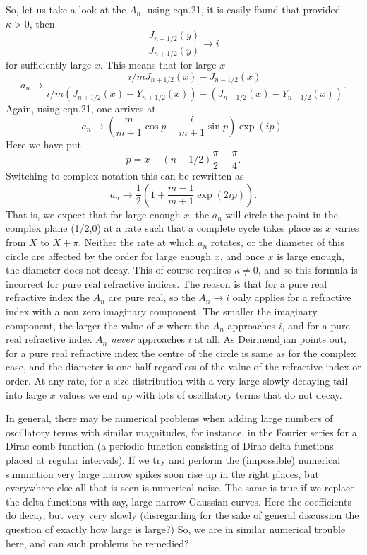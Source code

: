 \documentclass[12pt]{article}
\begin{document}
So, let us take a look at the $A_n$, using  eqn.21, it is easily found that provided $\kappa>0$,
then
\begin{equation}
\frac{J_{n-1/2}(y)}{J_{n+1/2}(y)} \rightarrow i
\end{equation}
for sufficiently large $x$.
This means that for large $x$
\begin{equation}
a_n \rightarrow \frac{ i/m J_{n+1/2}(x)-J_{n-1/2}(x)}
                     { i/m (J_{n+1/2}(x)-Y_{n+1/2}(x) ) -(J_{n-1/2}(x)-Y_{n-1/2}(x) ) }.
\end{equation}
Again, using eqn.21, one arrives at
\begin{equation}
a_n \rightarrow  \left ( \frac{m}{m+1} \cos p -\frac{i}{m+1} \sin p \right) \exp(ip).
\end{equation}
Here we have put
\begin{equation}
p=x-(n-1/2) \frac{\pi}{2} -\frac{\pi}{4}.
\end{equation}
Switching to complex notation this can be rewritten as
\begin{equation}
a_n \rightarrow \frac{1}{2} \left ( 1+\frac{m-1}{m+1}  \exp(2 i p) \right ).
\end{equation}
That is, we expect that for large enough $x$, the $a_n$ will  circle the point in the complex
plane (1/2,0) at a rate such that  a complete cycle takes place as $x$ varies from $X$
 to $X+\pi$. Neither the rate at which $a_n$ rotates, or the diameter of this circle are affected by the order
for large enough $x$, and once $x$ is large enough, the diameter does not decay.
 This of course requires $\kappa \ne 0$, and so this formula is incorrect
for pure real refractive indices. The reason is that for a pure real refractive 
index the $A_n$ are pure real, so the  $A_n \rightarrow i$ only applies for
a refractive index with a non zero imaginary component. The smaller the imaginary component, the larger the value of $x$ where the $A_n$ approaches $i$, and for a pure real refractive index
 $A_n$ {\it never} approaches $i$ at all. As Deirmendjian points out, for a pure real
refractive index the centre of the circle is same as for the complex case, and the diameter is
 one half regardless of the value of the refractive index or order. 
At any rate, for a size distribution with a very large  slowly decaying tail into large $x$
values we end up with lots of oscillatory terms that do not decay.



In general,  there may be numerical problems when adding large numbers of oscillatory terms
 with similar magnitudes, for instance, in the Fourier series for a Dirac comb function (a
periodic function consisting of Dirac delta functions placed at regular intervals).
 If we try and perform the (impossible) numerical summation 
 very large narrow spikes soon rise up in the right places,
 but everywhere else all that is seen is numerical noise. The same is true if we replace the
delta functions with say, large narrow Gaussian curves. Here the coefficients do decay, but very very 
slowly (disregarding for the sake of general discussion the question of exactly how large is large?)
So, we are in similar numerical trouble here, 
 and  can such problems be remedied?
\end{document}
